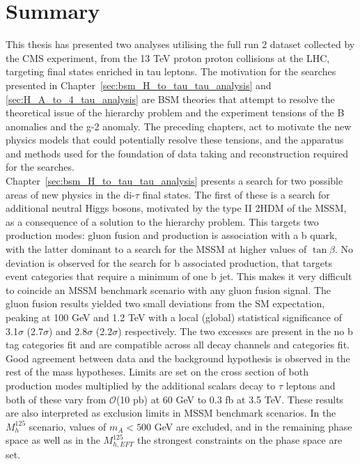 \section{Summary}

This thesis has presented two analyses utilising the full run 2 dataset collected by the \ac{CMS} experiment, from the 13 TeV proton proton collisions at the \ac{LHC}, targeting final states enriched in tau leptons.
The motivation for the searches presented in Chapter~\ref{sec:bsm_H_to_tau_tau_analysis} and \ref{sec:H_A_to_4_tau_analysis} are \ac{BSM} theories that attempt to resolve the theoretical issue of the hierarchy problem and the experiment tensions of the B anomalies and the g-2 anomaly.
The preceding chapters, act to motivate the new physics models that could potentially resolve these tensions, and the apparatus and methods used for the foundation of data taking and reconstruction required for the searches. \\

Chapter~\ref{sec:bsm_H_to_tau_tau_analysis} presents a search for two possible areas of new physics in the di-$\tau$ final states.
The first of these is a search for additional neutral Higgs bosons, motivated by the type II \ac{2HDM} of the \ac{MSSM}, as a consequence of a solution to the hierarchy problem.
This targets two production modes: gluon fusion and production is association with a b quark, with the latter dominant to a search for the \ac{MSSM} at higher values of $\tan\beta$.
No deviation is observed for the search for b associated production, that targets event categories that require a minimum of one b jet.
This makes it very difficult to coincide an \ac{MSSM} benchmark scenario with any gluon fusion signal.
The gluon fusion results yielded two small deviations from the \ac{SM} expectation, peaking at 100 GeV and 1.2 TeV with a local (global) statistical significance of 3.1$\sigma$ (2.7$\sigma$) and 2.8$\sigma$ (2.2$\sigma$) respectively.
The two excesses are present in the no b tag categories fit and are compatible across all decay channels and categories fit.
Good agreement between data and the background hypothesis is observed in the rest of the mass hypotheses.
Limits are set on the cross section of both production modes multiplied by the additional scalars decay to $\tau$ leptons and both of these vary from $\mathcal{O}$(10 pb) at 60 GeV to 0.3 fb at 3.5 TeV.
These results are also interpreted as exclusion limits in \ac{MSSM} benchmark scenarios.
In the $M_{h}^{125}$ scenario, values of $m_A < 500$ GeV are excluded, and in the remaining phase space as well as in the $M_{h, EFT}^{125}$ the strongest constraints on the phase space are set. \\

